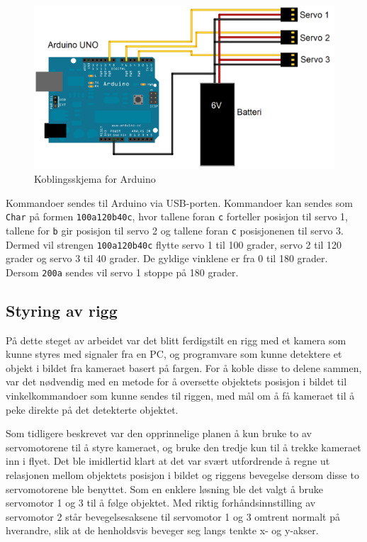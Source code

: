 \begin{figure}[h!]
	\centering
	\includegraphics[scale=0.25]{img/KoblingsskjemaArduino.png}
	\caption{Koblingsskjema for Arduino}
	\label{fig:ArduSkjem}
\end{figure}  

Kommandoer sendes til Arduino via USB-porten. Kommandoer kan sendes som \texttt{Char} på formen \texttt{100a120b40c}, hvor tallene foran \texttt{c} forteller posisjon til servo 1, tallene for \texttt{b} gir posisjon til servo 2 og tallene foran \texttt{c} posisjonenen til servo 3. Dermed vil strengen \texttt{100a120b40c} flytte servo 1 til 100 grader, servo 2 til 120 grader og servo 3 til 40 grader. De gyldige vinklene er fra 0 til 180 grader. Dersom \texttt{200a} sendes vil servo 1 stoppe på 180 grader. 

\subsection{Styring av rigg}

På dette steget av arbeidet var det blitt ferdigstilt en rigg med et kamera som kunne styres med signaler fra en PC, og programvare som kunne detektere et objekt i bildet fra kameraet basert på fargen. For å koble disse to delene sammen, var det nødvendig med en metode for å oversette objektets posisjon i bildet til vinkelkommandoer som kunne sendes til riggen, med mål om å få kameraet til å peke direkte på det detekterte objektet.

Som tidligere beskrevet var den opprinnelige planen å kun bruke to av servomotorene til å styre kameraet, og bruke den tredje kun til å trekke kameraet inn i flyet. Det ble imidlertid klart at det var svært utfordrende å regne ut relasjonen mellom objektets posisjon i bildet og riggens bevegelse dersom disse to servomotorene ble benyttet. Som en enklere løsning ble det valgt å bruke servomotor 1 og 3 til å følge objektet. Med riktig forhåndsinnstilling av servomotor 2 står bevegelsesaksene til servomotor 1 og 3 omtrent normalt på hverandre, slik at de henholdsvis beveger seg langs tenkte x- og y-akser.

